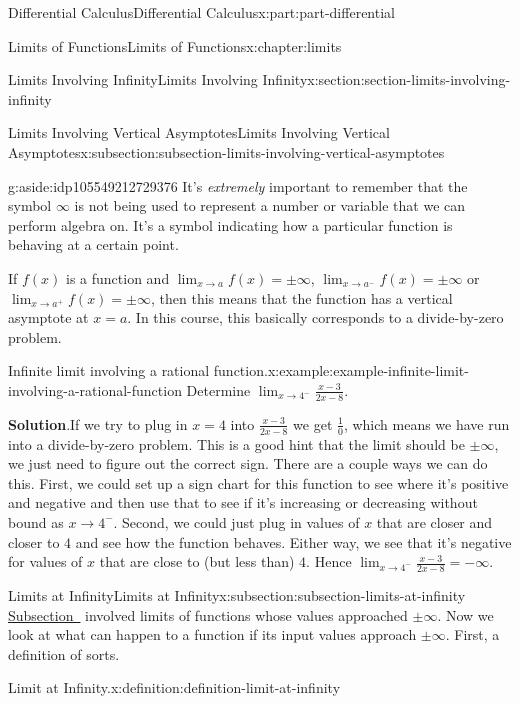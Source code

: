 \documentclass[twoside,10pt,]{book}
\newcommand{\blocktitlefont}{\relax}
\numberwithin{equation}{part}
\begin{document}
\begin{partptx}{Differential Calculus}{}{Differential Calculus}{}{}{x:part:part-differential}
\begin{chapterptx}{Limits of Functions}{}{Limits of Functions}{}{}{x:chapter:limits}
\begin{sectionptx}{Limits Involving Infinity}{}{Limits Involving Infinity}{}{}{x:section:section-limits-involving-infinity}
\begin{subsectionptx}{Limits Involving Vertical Asymptotes}{}{Limits Involving Vertical Asymptotes}{}{}{x:subsection:subsection-limits-involving-vertical-asymptotes}
\begin{aside}{}{g:aside:idp105549212729376}%
It's \emph{extremely} important to remember that the symbol \(\infty\) is not being used to represent a number or variable that we can perform algebra on. It's a symbol indicating how a particular function is behaving at a certain point.%
\end{aside}
If \(f(x)\) is a function and \(\lim_{x\to a}f(x)=\pm\infty\), \(\lim_{x\to a^{-}}f(x)=\pm\infty\) or \(\lim_{x\to a^{+}}f(x)=\pm\infty\), then this means that the function has a vertical asymptote at \(x=a\). In this course, this basically corresponds to a divide-by-zero problem.%
\begin{example}{Infinite limit involving a rational function.}{x:example:example-infinite-limit-involving-a-rational-function}%
Determine \(\lim_{x\to4^{-}}\frac{x-3}{2x-8}\).%
\par\smallskip%
\noindent\textbf{\blocktitlefont Solution}.\hypertarget{g:solution:idp105549212733984}{}\quad{}If we try to plug in \(x=4\) into \(\frac{x-3}{2x-8}\) we get \(\frac{1}{0}\), which means we have run into a divide-by-zero problem. This is a good hint that the limit should be \(\pm\infty\), we just need to figure out the correct sign. There are a couple ways we can do this. First, we could set up a sign chart for this function to see where it's positive and negative and then use that to see if it's increasing or decreasing without bound as \(x\to4^{-}\). Second, we could just plug in values of \(x\) that are closer and closer to \(4\) and see how the function behaves. Either way, we see that it's negative for values of \(x\) that are close to (but less than) \(4\). Hence \(\lim_{x\to4^{-}}\frac{x-3}{2x-8}=-\infty\).%
\end{example}
\end{subsectionptx}
%
%
\typeout{************************************************}
\typeout{************************************************}
%
\begin{subsectionptx}{Limits at Infinity}{}{Limits at Infinity}{}{}{x:subsection:subsection-limits-at-infinity}
\hyperref[x:subsection:subsection-limits-involving-vertical-asymptotes]{Subsection~} involved limits of functions whose values approached \(\pm\infty\). Now we look at what can happen to a function if its input values approach \(\pm\infty\). First, a definition of sorts.%
\begin{definition}{Limit at Infinity.}{x:definition:definition-limit-at-infinity}%

\end{definition}
\end{subsectionptx}
\end{sectionptx}
\end{chapterptx}
\end{partptx}
\end{document}
